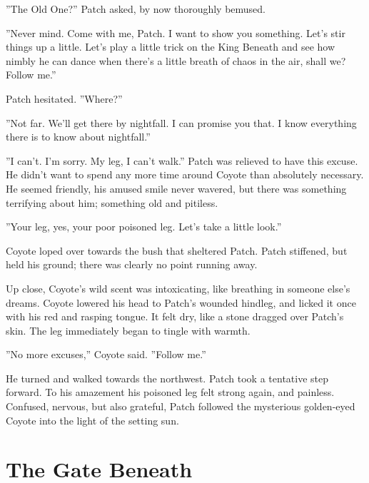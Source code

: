 \documentclass[12pt]{book}
\begin{document}
 ''The Old One?'' Patch asked, by now thoroughly bemused.\par
 ''Never mind. Come with me, Patch. I want to show you something. Let's stir things up a little. Let's play a little trick on the King Beneath and see how nimbly he can dance when there's a little breath of chaos in the air, shall we? Follow me.''\par
 Patch hesitated. ''Where?''\par
 ''Not far. We'll get there by nightfall. I can promise you that. I know everything there is to know about nightfall.''\par
 ''I can't. I'm sorry. My leg, I can't walk.'' Patch was relieved to have this excuse. He didn't want to spend any more time around Coyote than absolutely necessary. He seemed friendly, his amused smile never wavered, but there was something terrifying about him; something old and pitiless.\par
 ''Your leg, yes, your poor poisoned leg. Let's take a little look.''\par
 Coyote loped over towards the bush that sheltered Patch. Patch stiffened, but held his ground; there was clearly no point running away.\par
 Up close, Coyote's wild scent was intoxicating, like breathing in someone else's dreams. Coyote lowered his head to Patch's wounded hindleg, and licked it once with his red and rasping tongue. It felt dry, like a stone dragged over Patch's skin. The leg immediately began to tingle with warmth.\par
 ''No more excuses,'' Coyote said. ''Follow me.''\par
 He turned and walked towards the northwest. Patch took a tentative step forward. To his amazement his poisoned leg felt strong again, and painless. Confused, nervous, but also grateful, Patch followed the mysterious golden-eyed Coyote into the light of the setting sun.\par

\section{The Gate Beneath}
\end{document}
